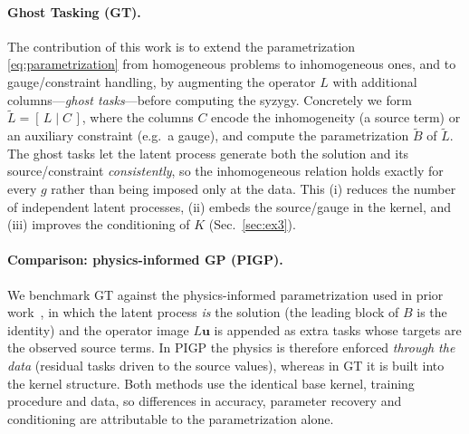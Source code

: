 \paragraph{Ghost Tasking (GT).}
The contribution of this work is to extend the parametrization
\eqref{eq:parametrization} from homogeneous problems to inhomogeneous
ones, and to gauge/constraint handling, by augmenting the operator
$L$ with additional columns---\emph{ghost tasks}---before computing the
syzygy.  Concretely we form $\tilde L=[\,L\mid C\,]$, where the columns
$C$ encode the inhomogeneity (a source term) or an auxiliary constraint
(e.g.\ a gauge), and compute the parametrization $\tilde B$ of
$\tilde L$.  The ghost tasks let the latent process generate both the
solution and its source/constraint \emph{consistently}, so the
inhomogeneous relation holds exactly for every $g$ rather than being
imposed only at the data.  This (i) reduces the number of independent
latent processes, (ii) embeds the source/gauge in the kernel, and
(iii) improves the conditioning of $K$ (Sec.~\ref{sec:ex3}).

\paragraph{Comparison: physics-informed GP (PIGP).}
We benchmark GT against the physics-informed parametrization used in
prior work~\cite{XXX_PIGP}, in which the latent process \emph{is} the
solution (the leading block of $B$ is the identity) and the operator
image $L\bm{u}$ is appended as extra tasks whose targets are the
observed source terms.  In PIGP the physics is therefore enforced
\emph{through the data} (residual tasks driven to the source values),
whereas in GT it is built into the kernel structure.  Both methods use
the identical base kernel, training procedure and data, so differences
in accuracy, parameter recovery and conditioning are attributable to
the parametrization alone.

